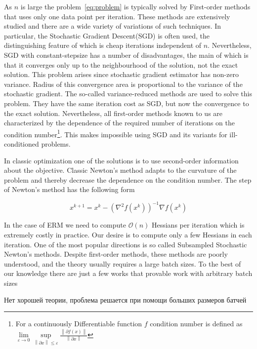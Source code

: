\documentclass{article}
\begin{document}
As $n$ is large the problem~\eqref{eq:problem} is typically solved by First-order methods that uses only one data point per iteration. These methods are extensively studied and there are a wide variety of variations of such techniques. In particular, the Stochastic Gradient Descent(SGD) is often used, the distinguishing feature of which is cheap iterations independent of $n$. Nevertheless, SGD with constant-stepsize has a number of disadvantages, the main of which is that it converges only up to the neighbourhood of the solution, not the exact solution. This problem arises since stochastic gradient estimator has non-zero variance. Radius of this convergence area is proportional to the variance of the stochastic gradient. The so-called variance-reduced methods \cite{svrg, saga} are used to solve this problem. They have the same iteration cost as SGD, but now the convergence to the exact solution. Nevertheless, all first-order methods known to us are characterized by the dependence of the required number of iterations on the condition number\footnote{For a continuously Differentiable function $f$ condition number is defined as $\lim\limits_{\varepsilon \rightarrow 0} \sup\limits_{\left\|\partial x\right\| \leq \varepsilon} \frac{\left\|\partial f\left(x\right)\right\|}{\left\|\partial x\right\|}$}. This makes impossible using SGD and its variants for ill-conditioned problems.

In classic optimization one of the solutions is to use second-order information about the objective. Classic Newton's method adapts to the curvature of the problem and thereby decrease the dependence on the condition number. The step of Newton's method has the following form

\begin{equation}
    x^{k+1} = x^k - \left(\nabla^2f\left(x^k\right)\right)^{-1}\nabla f\left(x^k\right)
\end{equation}

In the case of ERM we need to compute $\mathcal{O}(n)$ Hessians per iteration which is extremely costly in practice. Our desire is to compute only a few Hessians in each iteration. One of the most popular directions is so called Subsampled Stochastic Newton's methods. Despite first-order methods, these methods are poorly understood, and the theory usually requires a large batch sizes. To the best of our knowledge there are just a few works that provable work with arbitrary batch sizes \cite{litlink3, litlink5} 

Нет хорошей теории, проблема решается при помощи больших размеров батчей
\end{document}
